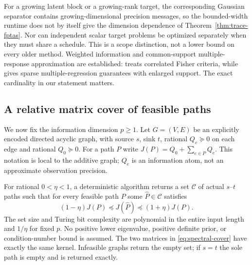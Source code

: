 For a growing latent block or a growing-rank target, the corresponding
Gaussian separator contains growing-dimensional precision messages, so the
bounded-width runtime does not by itself give the dimension dependence of
Theorem~\ref{thm:trace-fptas}. Nor can independent scalar target problems
be optimized separately when they must share a schedule. This is a scope
distinction, not a lower bound on every older method. Weighted
information and common-support multiple-response approximation are established:
\citet{Liu2016} treats correlated Fisher criteria, while
\citet[Section 5]{Liberty2017} gives sparse multiple-regression guarantees
with enlarged support. The exact cardinality in our statement matters.

\subsection{A relative matrix cover of feasible paths}
\label{subsec:spectral-set}
We now fix the information dimension $p\ge1$. Let $G=(V,E)$ be an explicitly
encoded directed acyclic graph, with source $s$, sink $t$, rational
$Q_e\succeq0$ on each edge and rational $Q_0\succeq0$. For a path $P$ write
$J(P)=Q_0+\sum_{e\in P}Q_e$. This notation is local to the additive graph;
$Q_e$ is an information atom, not an approximate observation precision.

\begin{theorem}
\label{thm:dag-spectral-set}
For rational $0<\eta<1$, a deterministic algorithm returns a set $\mathcal C$
of actual $s$--$t$ paths such that for every feasible path $P$ some
$\widehat P\in\mathcal C$ satisfies
\begin{equation}
 (1-\eta)J(P)\preceq J(\widehat P)\preceq(1+\eta)J(P).
 \label{eq:spectral-cover}
\end{equation}
The set size and Turing bit complexity are polynomial in the entire input
length and $1/\eta$ for fixed $p$. No positive lower eigenvalue, positive
definite prior, or condition-number bound is assumed. The two matrices in
\eqref{eq:spectral-cover} have exactly the same kernel. Infeasible graphs
return the empty set; if $s=t$ the sole path is empty and is returned exactly.
\end{theorem}

